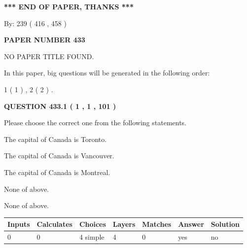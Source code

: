 \documentclass[12pt]{article}
\begin{document}
   
   
   
\vspace{1.0in} 
{\textbf{\large{ *** END OF PAPER, THANKS *** }}} 
   
   
\hspace{1.0in} By: 
 239 ( 416 ,  458 )
   
   
   
   
\newpage 
\setcounter{page}{ 
   433001 } 
   
   
   
   
 {\textbf{ \Large{ PAPER NUMBER  433  }}}
   
   
\vspace{0.2in}
   
   
   
   
   
   
 NO PAPER TITLE FOUND.
   
   
   
\vspace{0.2in}
   
In this paper, big questions will be generated in the following order: 
   
   
   1 ( 1 )
 ,
   2 ( 2 )
 .
  
\vspace{0.2in}
  
{\textbf{\Large{QUESTION
433.1 
 ( 1 , 1 , 101 )
}}}
  
  
Please choose the correct one from the following statements.
 
 
The capital of Canada is Toronto.
 
 
The capital of Canada is Vancouver.
 
 
The capital of Canada is Montreal.
 
 
 None of above.
 
 
\noindent{}
 
 
 None of above.
 
 
\noindent{}
 
 
   
   
   
   
\noindent\begin{tabular}{|l|l|l|l|l|l|l|}
 \hline
Inputs & Calculates & Choices & Layers & Matches & Answer & Solution \\ \hline
 0  & 
 0  & 
 4
  simple  
  & 
 4  & 
 0  & 
  yes & 
  no 
  \\ \hline
 \end{tabular}
   
\end{document}
